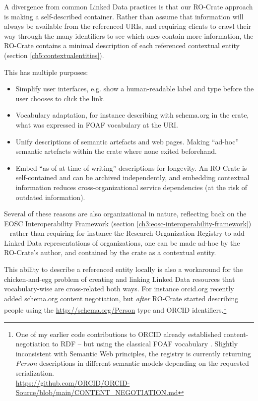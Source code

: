 A divergence from common Linked Data practices is that our RO-Crate approach is making a self-described container.
Rather than assume that information will always be available from the referenced URIs, and requiring clients to crawl their way through the many identifiers to see which ones contain more information, the RO-Crate contains a minimal description of each referenced contextual entity (section \vref{ch5:contextualentities}). 

This has multiple purposes:

\begin{itemize}
    \item Simplify user interfaces, e.g. show a human-readable label and type before the user chooses to click the link.
    \item Vocabulary adaptation, for instance describing with schema.org in the crate, what was expressed in FOAF vocabulary at the URI.
    \item Unify descriptions of semantic artefacts and web pages. 
          Making ``ad-hoc'' semantic artefacts within the crate where none exited beforehand.
    \item Embed ``as of at time of writing'' descriptions for longevity. 
          An RO-Crate is self-contained and can be archived independently, and embedding contextual information reduces cross-organizational service dependencies (at the risk of outdated information).
\end{itemize}

Several of these reasons are also organizational in nature, reflecting back on the EOSC Interoperability Framework (section \vref{ch3:eosc-interoperability-framework}) -- rather than requiring for instance the Research Organization Registry  to add Linked Data representations of organizations, one can be made ad-hoc by the RO-Crate's author, and contained by the crate as a contextual entity. 

This ability to describe a referenced entity locally is also a workaround for the chicken-and-egg problem of creating and linking Linked Data resources that vocabulary-wise are cross-related both ways. For instance orcid.org recently added schema.org content negotiation, but \emph{after} RO-Crate started describing people using the \url{http://schema.org/Person} type and ORCID identifiers.\footnote{
  One of my earlier code contributions to ORCID already established content-negotiation to RDF -- but using the classical FOAF vocabulary \cite{FOAFVocabularySpecification}.
  Slightly inconsistent with Semantic Web principles, the registry is currently returning \emph{Person} descriptions in different semantic models depending on the requested serialization. \\
  \url{https://github.com/ORCID/ORCID-Source/blob/main/CONTENT_NEGOTIATION.md}} 



